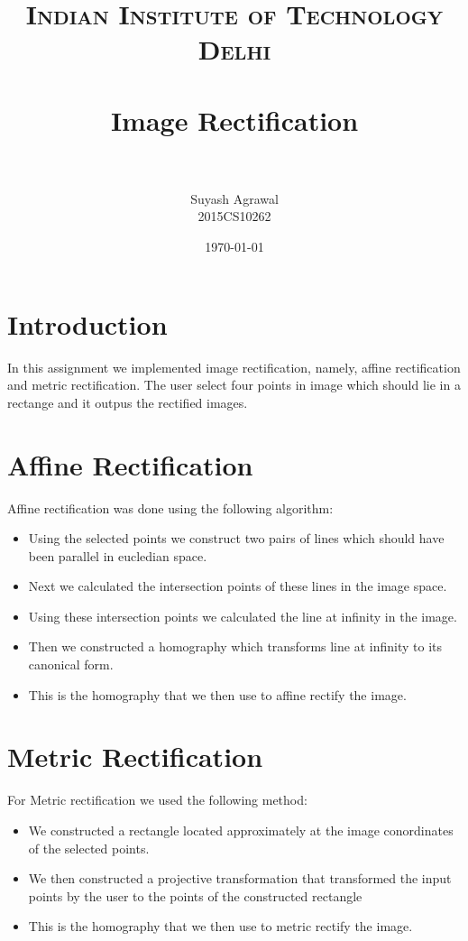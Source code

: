 \documentclass[paper=a4, fontsize=11pt]{scrartcl} %
\title{	
\normalfont \normalsize 
\textsc{Indian Institute of Technology Delhi} \\ [25pt] %
\horrule{0.5pt} \\[0.4cm] %
\huge Image Rectification \\ %
\horrule{2pt} \\[0.5cm] %
}
\author{Suyash Agrawal \\ 2015CS10262} %
\date{\normalsize\today} %
\begin{document}
\maketitle %

\section{Introduction}
In this assignment we implemented image rectification, namely, affine rectification and metric rectification.
The user select four points in image which should lie in a rectange and it outpus the rectified images.

\section{Affine Rectification}
Affine rectification was done using the following algorithm:
\begin{itemize}
    \item Using the selected points we construct two pairs of lines which should have been parallel in eucledian space.
    \item Next we calculated the intersection points of these lines in the image space.
    \item Using these intersection points we calculated the line at infinity in the image.
    \item Then we constructed a homography which transforms line at infinity to its canonical form.
    \item This is the homography that we then use to affine rectify the image. 
\end{itemize}

\section{Metric Rectification}
For Metric rectification we used the following method:
\begin{itemize}
    \item We constructed a rectangle located approximately at the image conordinates of the selected points.
    \item We then constructed a projective transformation that transformed the input points by the user to the
          points of the constructed rectangle
    \item This is the homography that we then use to metric rectify the image.
\end{itemize}
\end{document}

